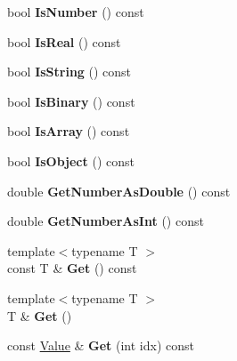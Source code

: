 \begin{DoxyCompactItemize}
bool {\bfseries Is\+Number} () const
\item 
\mbox{\label{classtinygltf_1_1Value_a62a423efe05ebbdb98f5e56114b3f0a5}} 
bool {\bfseries Is\+Real} () const
\item 
\mbox{\label{classtinygltf_1_1Value_a7b783b4d683538870151cb2efc3df676}} 
bool {\bfseries Is\+String} () const
\item 
\mbox{\label{classtinygltf_1_1Value_aa63dee73585e980573d882c718101867}} 
bool {\bfseries Is\+Binary} () const
\item 
\mbox{\label{classtinygltf_1_1Value_aec6d24d7fda47506a91ed51aae5b8730}} 
bool {\bfseries Is\+Array} () const
\item 
\mbox{\label{classtinygltf_1_1Value_a2c340b7e0cf07cca233c24004b501fb7}} 
bool {\bfseries Is\+Object} () const
\item 
\mbox{\label{classtinygltf_1_1Value_a4d67519361e55a9aae72e0ffda7f2b05}} 
double {\bfseries Get\+Number\+As\+Double} () const
\item 
\mbox{\label{classtinygltf_1_1Value_a616496eecbdd0b848c6e4d42109a6f12}} 
double {\bfseries Get\+Number\+As\+Int} () const
\item 
\mbox{\label{classtinygltf_1_1Value_a1ca1d0c77d1f4603efd354f003e1f972}} 
{\footnotesize template$<$typename T $>$ }\\const T \& {\bfseries Get} () const
\item 
\mbox{\label{classtinygltf_1_1Value_a0f7cb192a694f02eb4fe9f2b2df3ad5b}} 
{\footnotesize template$<$typename T $>$ }\\T \& {\bfseries Get} ()
\item 
\mbox{\label{classtinygltf_1_1Value_a6005a7e1bb470385605945adf04b3c75}} 
const \hyperlink{classtinygltf_1_1Value}{Value} \& {\bfseries Get} (int idx) const
\item 
\mbox{\label{classtinygltf_1_1Value_abe4a3809bc576c475ddb47000ef80da8}} 

\end{DoxyCompactItemize}
